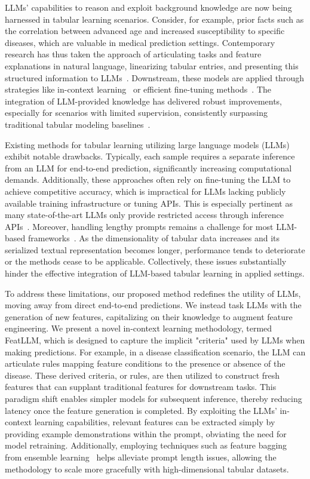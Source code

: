 LLMs’ capabilities to reason and exploit background knowledge are now being harnessed in tabular learning scenarios. Consider, for example, prior facts such as the correlation between advanced age and increased susceptibility to specific diseases, which are valuable in medical prediction settings. Contemporary research has thus taken the approach of articulating tasks and feature explanations in natural language, linearizing tabular entries, and presenting this structured information to LLMs~\cite{dinh2022lift,wang2023anypredict}. Downstream, these models are applied through strategies like in-context learning~\cite{nam2023semi} or efficient fine-tuning methods~\cite{dinh2022lift,hegselmann2023tabllm}. The integration of LLM-provided knowledge has delivered robust improvements, especially for scenarios with limited supervision, consistently surpassing traditional tabular modeling baselines~\cite{hegselmann2023tabllm}.

Existing methods for tabular learning utilizing large language models (LLMs) exhibit notable drawbacks. Typically, each sample requires a separate inference from an LLM for end-to-end prediction, significantly increasing computational demands. Additionally, these approaches often rely on fine-tuning the LLM to achieve competitive accuracy, which is impractical for LLMs lacking publicly available training infrastructure or tuning APIs. This is especially pertinent as many state-of-the-art LLMs only provide restricted access through inference APIs~\cite{anil2023palm,openai2023gpt4}. Moreover, handling lengthy prompts remains a challenge for most LLM-based frameworks~\cite{liu2023lost}. As the dimensionality of tabular data increases and its serialized textual representation becomes longer, performance tends to deteriorate or the methods cease to be applicable. Collectively, these issues substantially hinder the effective integration of LLM-based tabular learning in applied settings.

To address these limitations, our proposed method redefines the utility of LLMs, moving away from direct end-to-end predictions. We instead task LLMs with the generation of new features, capitalizing on their knowledge to augment feature engineering. We present a novel in-context learning methodology, termed \textsf{FeatLLM}, which is designed to capture the implicit "criteria" used by LLMs when making predictions. For example, in a disease classification scenario, the LLM can articulate rules mapping feature conditions to the presence or absence of the disease. These derived criteria, or rules, are then utilized to construct fresh features that can supplant traditional features for downstream tasks. This paradigm shift enables simpler models for subsequent inference, thereby reducing latency once the feature generation is completed. By exploiting the LLMs’ in-context learning capabilities, relevant features can be extracted simply by providing example demonstrations within the prompt, obviating the need for model retraining. Additionally, employing techniques such as feature bagging from ensemble learning~\cite{breiman2001random} helps alleviate prompt length issues, allowing the methodology to scale more gracefully with high-dimensional tabular datasets.

